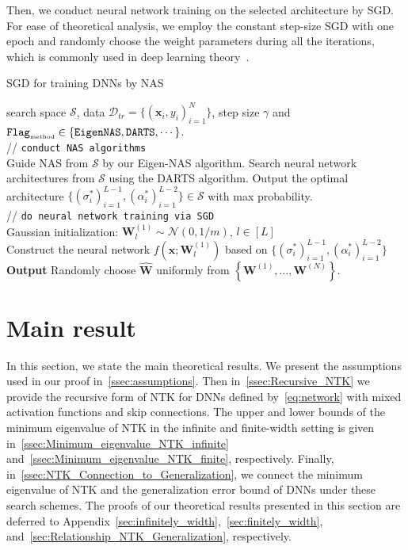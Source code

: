 \documentclass[nohyperref]{article}
\theoremstyle{plain}
\theoremstyle{definition}
\theoremstyle{remark}
\begin{document}
Then, we conduct neural network training on the selected architecture by SGD. For ease of theoretical analysis, we employ the constant step-size SGD with one epoch and randomly choose the weight parameters during all the iterations, which is commonly used in deep learning theory~\citep{cao2019generalization,Zou2019GradientDO}.



\begin{algorithm}[t]
\caption{SGD for training DNNs by NAS}
\label{alg:algorithm_DARTS}
\begin{algorithmic}
 search space $\mathcal{S}$, data $\mathcal{D}_{tr} = \{ (\bm x_i, y_i)_{i=1}^N \}$, step size $\gamma$ and ${\tt Flag}_{\mbox{\tiny method}} \in \left \{\tt EigenNAS, DARTS, \cdots \right \} $.\\
// {\tt conduct NAS algorithms}\\
\STATE Guide NAS from $\mathcal{S}$ by our Eigen-NAS algorithm.
 \STATE Search neural network architectures from $\mathcal{S}$ using the DARTS algorithm.
\ENDIF
\STATE Output the optimal architecture $\{ (\sigma^*_i)_{i=1}^{L-1}, (\alpha^*_i)_{i=1}^{L-2} \} \in \mathcal{S}$ with max probability.\\
// {\tt do neural network training via SGD}\\
\STATE   Gaussian initialization:
$\bm{W}_l^{(1)} \sim \mathcal{N}(0,1/m)$, $l \in [L]$\\
\STATE Construct the neural network $f(\bm x; \bm{W}_l^{(1)})$ based on $\{ (\sigma^*_i)_{i=1}^{L-1}, (\alpha^*_i)_{i=1}^{L-2} \}$ 
\ENDFOR \\
\textbf{Output} 
Randomly choose $\hat{\bm{W}}$ uniformly from $\left \{ \bm{W}^{(1)}, \dots , \bm{W}^{(N)} \right \} $.
\end{algorithmic}
\end{algorithm}
 \section{Main result}
\label{ssec:main_result}


In this section, we state the main theoretical results. We present the assumptions used in our proof in~\cref{ssec:assumptions}. Then in~\cref{ssec:Recursive_NTK} we provide the recursive form of NTK for DNNs defined by~\cref{eq:network} with mixed activation functions and skip connections.
The upper and lower bounds of the minimum eigenvalue of NTK in the infinite and finite-width setting is given in~\cref{ssec:Minimum_eigenvalue_NTK_infinite} and~\ref{ssec:Minimum_eigenvalue_NTK_finite}, respectively.
Finally, in~\cref{ssec:NTK_Connection_to_Generalization}, we connect the minimum eigenvalue of NTK and the generalization error bound of DNNs under these search schemes.
The proofs of our theoretical results presented in this section are deferred to Appendix~\ref{sec:infinitely_width},~\ref{sec:finitely_width}, and~\ref{sec:Relationship_NTK_Generalization}, respectively.
\end{document}
